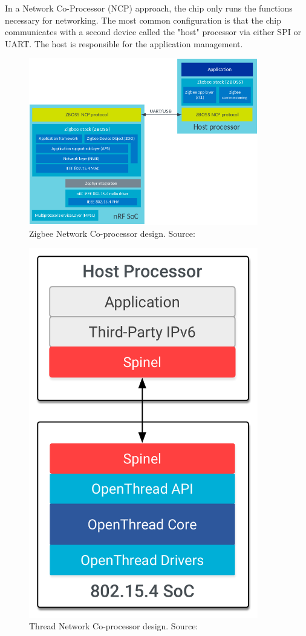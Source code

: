 In a Network Co-Processor (NCP) approach, the chip only runs the functions necessary for networking. The most common configuration is that the chip communicates with a second device called the "host" processor via either SPI or UART. The host is responsible for the application management.

\begin{figure}
    \centering
    \includegraphics[width=100mm, keepaspectratio]{figures/zigbee_platform_design_ncp-nordicsemi.png}
    \caption{Zigbee Network Co-processor design. Source: \cite{nordic:zigbee}}
    \label{fig:mp:zig-ncp}
\end{figure}

\begin{figure}
    \centering
    \includegraphics[width=100mm, keepaspectratio]{figures/ot-arch-ncp-vert_2x.png}
    \caption{Thread Network Co-processor design. Source: \cite{thread:platforms}}
    \label{fig:mp:thread-ncp}
\end{figure}

